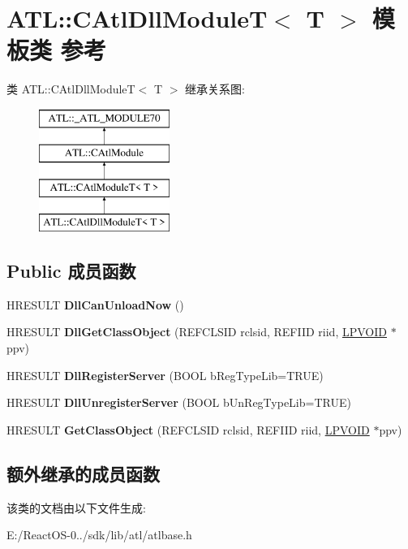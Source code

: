 \hypertarget{class_a_t_l_1_1_c_atl_dll_module_t}{}\section{A\+TL\+:\+:C\+Atl\+Dll\+ModuleT$<$ T $>$ 模板类 参考}
\label{class_a_t_l_1_1_c_atl_dll_module_t}
类 A\+TL\+:\+:C\+Atl\+Dll\+ModuleT$<$ T $>$ 继承关系图\+:\begin{figure}[H]
\begin{center}
\leavevmode
\includegraphics[height=4.000000cm]{class_a_t_l_1_1_c_atl_dll_module_t}
\end{center}
\end{figure}
\subsection*{Public 成员函数}
\begin{DoxyCompactItemize}
\item 
\mbox{\label{class_a_t_l_1_1_c_atl_dll_module_t_afafaaa2dc871fe246908e477d28fdbe5}} 
H\+R\+E\+S\+U\+LT {\bfseries Dll\+Can\+Unload\+Now} ()
\item 
\mbox{\label{class_a_t_l_1_1_c_atl_dll_module_t_a6565bedab83efa0e444ecf0dc5ba567b}} 
H\+R\+E\+S\+U\+LT {\bfseries Dll\+Get\+Class\+Object} (R\+E\+F\+C\+L\+S\+ID rclsid, R\+E\+F\+I\+ID riid, \hyperlink{interfacevoid}{L\+P\+V\+O\+ID} $\ast$ppv)
\item 
\mbox{\label{class_a_t_l_1_1_c_atl_dll_module_t_ac1b3ded78adf095fb81f41d11360b20f}} 
H\+R\+E\+S\+U\+LT {\bfseries Dll\+Register\+Server} (B\+O\+OL b\+Reg\+Type\+Lib=T\+R\+UE)
\item 
\mbox{\label{class_a_t_l_1_1_c_atl_dll_module_t_a89be7f2fae02f8f21d849caefe2fd751}} 
H\+R\+E\+S\+U\+LT {\bfseries Dll\+Unregister\+Server} (B\+O\+OL b\+Un\+Reg\+Type\+Lib=T\+R\+UE)
\item 
\mbox{\label{class_a_t_l_1_1_c_atl_dll_module_t_aa863817ecd8ec53ab799d633398dbb58}} 
H\+R\+E\+S\+U\+LT {\bfseries Get\+Class\+Object} (R\+E\+F\+C\+L\+S\+ID rclsid, R\+E\+F\+I\+ID riid, \hyperlink{interfacevoid}{L\+P\+V\+O\+ID} $\ast$ppv)
\end{DoxyCompactItemize}
\subsection*{额外继承的成员函数}


该类的文档由以下文件生成\+:\begin{DoxyCompactItemize}
\item 
E\+:/\+React\+O\+S-\/0../sdk/lib/atl/atlbase.\+h\end{DoxyCompactItemize}
